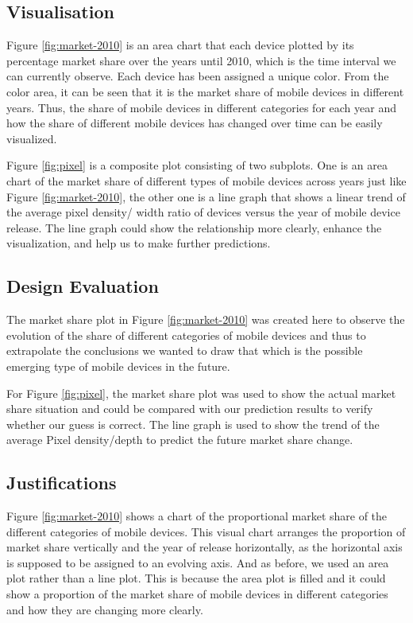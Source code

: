 \documentclass[conference]{IEEEtran}
\begin{document}
\subsection{Visualisation}
Figure \ref{fig:market-2010} is an area chart that each device plotted by its percentage market share over the years until 2010, which is the time interval we can currently observe. Each device has been assigned a unique color. From the color area, it can be seen that it is the market share of mobile devices in different years. Thus, the share of mobile devices in different categories for each year and how the share of different mobile devices has changed over time can be easily visualized.

Figure \ref{fig:pixel} is a composite plot consisting of two subplots. One is an area chart of the market share of different types of mobile devices across years just like Figure \ref{fig:market-2010}, the other one is a line graph that shows a linear trend of the average pixel density/ width ratio of devices versus the year of mobile device release. The line graph could show the relationship more clearly, enhance the visualization, and help us to make further predictions.

\subsection{Design Evaluation}
The market share plot in Figure \ref{fig:market-2010} was created here to observe the evolution of the share of different categories of mobile devices and thus to extrapolate the conclusions we wanted to draw that which is the possible emerging type of mobile devices in the future.

For Figure \ref{fig:pixel}, the market share plot was used to show the actual market share situation and could be compared with our prediction results to verify whether our guess is correct. The line graph is used to show the trend of the average Pixel density/depth to predict the future market share change.

\subsection{Justifications}
Figure \ref{fig:market-2010} shows a chart of the proportional market share of the different categories of mobile devices. This visual chart arranges the proportion of market share vertically and the year of release horizontally, as the horizontal axis is supposed to be assigned to an evolving axis. And as before, we used an area plot rather than a line plot. This is because the area plot is filled and it could show a proportion of the market share of mobile devices in different categories and how they are changing more clearly. 
\end{document}
